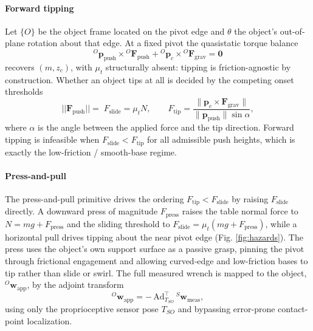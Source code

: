 \documentclass[10pt, conference]{IEEEtran}
\begin{document}
\paragraph{Forward tipping}
Let $\{O\}$ be the object frame located on the pivot edge and $\theta$ the object's out-of-plane rotation about that edge. At a fixed pivot the quasistatic torque balance
\begin{equation}
    {}^{O}\mathbf{p}_{\mathrm{push}}\times{}^{O}\mathbf{F}_{\mathrm{push}}
    + {}^{O}\mathbf{p}_{c}\times{}^{O}\mathbf{F}_{\mathrm{grav}} = \mathbf{0}
    \label{eq:torque_balance}
\end{equation}
recovers $(m, z_c)$, with $\mu_t$ structurally absent: tipping is friction-agnostic by construction. Whether an object tips at all is decided by the competing onset thresholds
\begin{equation}
  ||\mathbf{F}_\mathrm{push}|| = \;  
  F_{\mathrm{slide}} = \mu_t N, \qquad
    F_{\mathrm{tip}} = \frac{\lVert \mathbf{p}_c\times\mathbf{F}_{\mathrm{grav}}\rVert}
                            {\lVert\mathbf{p}_{\mathrm{push}}\rVert \sin\alpha},
    \label{eq:thresholds}
\end{equation}
where $\alpha$ is the angle between the applied force and the tip direction. Forward tipping is infeasible when $F_{\mathrm{slide}} < F_{\mathrm{tip}}$ for all admissible push heights, which is exactly the low-friction / smooth-base regime.

\paragraph{Press-and-pull}
The press-and-pull primitive drives the ordering $F_{\mathrm{tip}} < F_{\mathrm{slide}}$ by raising $F_{\mathrm{slide}}$ directly. A downward press of magnitude $F_{\mathrm{press}}$ raises the table normal force to $N = mg + F_{\mathrm{press}}$ and the sliding threshold to $F_{\mathrm{slide}} = \mu_t(mg + F_{\mathrm{press}})$, while a horizontal pull drives tipping about the near pivot edge (Fig. \ref{fig:hazards}). The press uses the object's own support surface as a passive grasp, pinning the pivot through frictional engagement and allowing curved-edge and low-friction bases to tip rather than slide or swirl. The full measured wrench is mapped to the object, ${}^{O}\mathbf{w}_\mathrm{app}$, by the adjoint transform
\begin{equation}
    {}^{O}\mathbf{w}_{\mathrm{app}} = -\,\mathrm{Ad}^{\!\top}_{T_{SO}}\,{}^{S}\mathbf{w}_{\mathrm{meas}},
    \label{eq:adjoint}
\end{equation}
using only the proprioceptive sensor pose $T_{SO}$ and bypassing error-prone contact-point localization.
\end{document}
